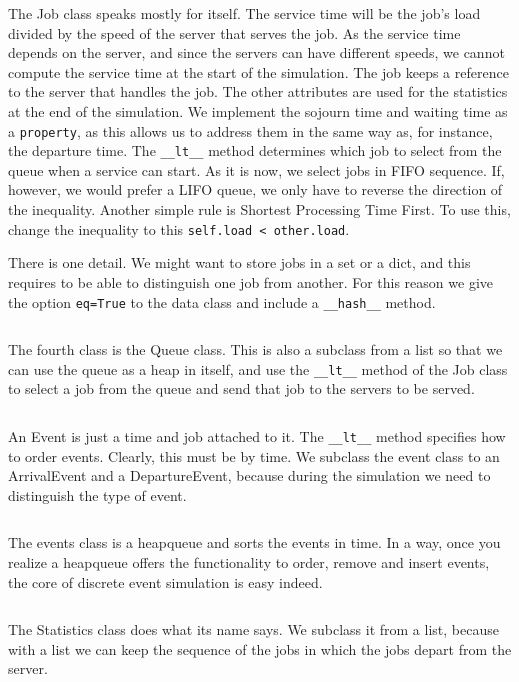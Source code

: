 \documentclass[stochastic-or.tex]{subfiles}
\begin{document}
The Job class speaks mostly for itself.
The service time will be the job's load divided by the speed of the server that serves the job.
As the service time depends on the server, and since the servers can have different speeds, we cannot compute the service time at the start of the simulation.
The job keeps a reference to the server that handles the job.
The other attributes are used for the statistics at the end of the simulation.
We implement the sojourn time and waiting time as a \texttt{property}, as this allows us to address them in the same way as, for instance, the departure time.
The \texttt{__lt__} method determines which job to select from the queue when a service can start.
As it is now, we select jobs in FIFO sequence.
If, however, we would prefer a LIFO queue, we only have to reverse the direction of the inequality.
Another simple rule is Shortest Processing Time First.
To use this, change the inequality to this \texttt{self.load < other.load}.

There is one detail.
We might want to store jobs in a set or a dict, and this requires to be able to distinguish one job from another.
For this reason we give the option \texttt{eq=True} to the data class and include a \texttt{__hash__} method.
\inputminted[label=job.py]{python}{../code/event_stacks/job.py}

The fourth class is the Queue class.
This is also a subclass from a list so that we can use the queue as a heap in itself, and use the \texttt{__lt__} method of the Job class to select a job from the queue and send that job to the servers to be served.
\inputminted[label=queues.py]{python}{../code/event_stacks/queues.py}

An Event is just a time and job attached to it. The \texttt{__lt__} method specifies how to order events. Clearly, this must be by time.
We subclass the event class to an ArrivalEvent and a DepartureEvent, because during the simulation we need to distinguish the type of event.
\inputminted[label=event.py]{python}{../code/event_stacks/event.py}

The events class is a heapqueue and sorts the events in time. In a way, once you realize a heapqueue offers the functionality to order, remove and insert events, the core of discrete event simulation is easy indeed.
\inputminted[label=events.py]{python}{../code/event_stacks/events.py}

The Statistics class does what its name says.
We subclass it from a list, because with a list we can keep the sequence of the jobs in which the jobs depart from the server.
\inputminted[label=stats.py]{python}{../code/event_stacks/stats.py}
\end{document}
